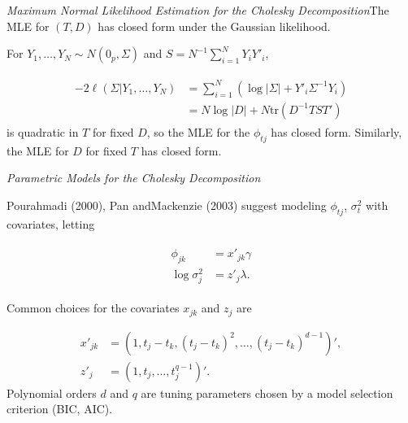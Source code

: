 \begin{frame}{\emph{Maximum Normal Likelihood Estimation for the Cholesky Decomposition}}{The MLE for $\left(T,D\right)$ has closed form under the Gaussian likelihood.}

For  $Y_1,\dots , Y_N \sim N\left(0_p, \Sigma\right)$ and $S = N^{-1}\sum_{i=1}^N Y_iY'_i$,

\begin{align}
\begin{split} \label{eq:regular-cholesky-log-likelihood}
-2\ell\left(\Sigma \vert Y_1,\dots, Y_N\right) &= \sum_{i = 1}^N \left( \log \vert \Sigma \vert  + Y'_i \Sigma^{-1}Y_i\right) \\
& = N \log \vert D \vert + N \mbox{tr}\left(D^{-1}TST'\right)
\end{split}
\end{align}
\noindent
is quadratic in $T$ for fixed $D$, so the MLE for the $\phi_{tj}$ has closed form. Similarly, the MLE for $D$ for fixed $T$ has closed form. 
\end{frame}






\begin{frame}{\emph{Parametric Models for the Cholesky Decomposition}}{} \label{polynomial-mcd-model}

Pourahmadi (2000), Pan andMackenzie (2003) suggest modeling $\phi_{tj}$, $\sigma^2_{t}$ with covariates, letting 

\begin{align*}
\begin{split}  \label{eq:GARP-IV-parametric-model}
\phi_{jk} &= x'_{jk} \gamma \\
\log \sigma^2_{j} &= z'_{j}\lambda. 
\end{split}
\end{align*}

Common choices for the covariates $x_{jk}$ and $z_j$ are

\begin{align*}
x'_{jk} &= \left(1, t_j - t_k, \left(t_j - t_k\right)^2,\dots, \left(t_j - t_k\right)^{d-1}\right)', \\
z'_{j}  &= \left(1, t_j, \dots, t_j^{q-1}\right)'.
\end{align*} \label{eq:mcd-polynomial-model}
\noindent
Polynomial orders $d$ and $q$ are tuning parameters chosen by a model selection criterion (BIC, AIC).
\vspace{1cm}

\hyperlink{simulation-studies-benchmark-estimators}{}

\end{frame}


